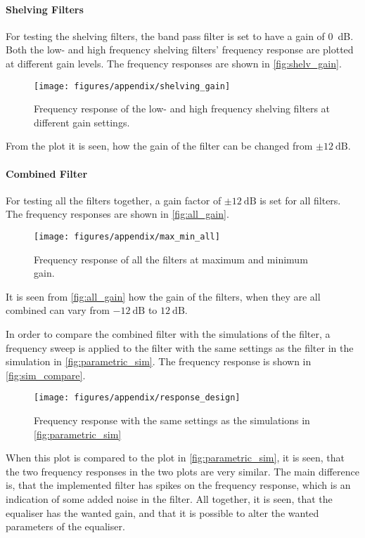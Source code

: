 \paragraph{Shelving Filters}
For testing the shelving filters, the band pass filter is set to have a gain of \SI{0}{\deci\bel}. Both the low- and high frequency shelving filters' frequency response are plotted at different gain levels. The frequency responses are shown in \autoref{fig:shelv_gain}.

\begin{figure}[H]
	\centering
	\texttt{[image: figures/appendix/shelving\_gain]}
	\caption{Frequency response of the low- and high frequency shelving filters at different gain settings.}
	\label{fig:shelv_gain}
\end{figure}
From the plot it is seen, how the gain of the filter can be changed from $\pm \SI{12}{\deci\bel}$.

\paragraph{Combined Filter}
For testing all the filters together, a gain factor of $\pm \SI{12}{\deci\bel}$ is set for all filters. The frequency responses are shown in \autoref{fig:all_gain}.

\begin{figure}[httb]
	\centering
	\texttt{[image: figures/appendix/max\_min\_all]}
	\caption{Frequency response of all the filters at maximum and minimum gain.}
	\label{fig:all_gain}
\end{figure}
It is seen from \autoref{fig:all_gain} how the gain of the filters, when they are all combined can vary from $\SI{-12}{\deci\bel}$ to $\SI{12}{\deci\bel}$.

In order to compare the combined filter with the simulations of the filter, a frequency sweep is applied to the filter with the same settings as the filter in the  simulation in \autoref{fig:parametric_sim}. The frequency response is shown in \autoref{fig:sim_compare}.

\begin{figure}[httb]
	\centering
	\texttt{[image: figures/appendix/response\_design]}
	\caption{Frequency response with the same settings as the simulations in \autoref{fig:parametric_sim}}
	\label{fig:sim_compare}
\end{figure}

When this plot is compared to the plot in \autoref{fig:parametric_sim}, it is seen, that the two frequency responses in the two plots are very similar. The main difference is, that the implemented filter has spikes on the frequency response, which is an indication of some added noise in the filter.
All together, it is seen, that the equaliser has the wanted gain, and that it is possible to alter the wanted parameters of the equaliser.








